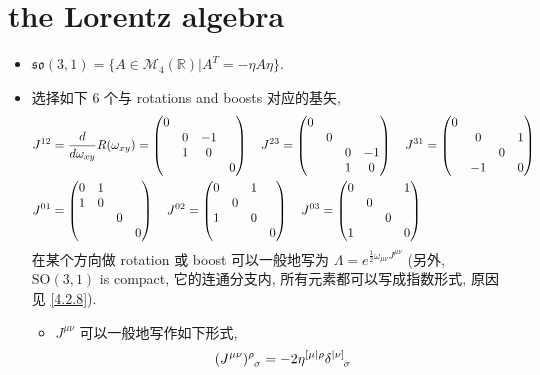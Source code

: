 \section{the Lorentz algebra}
\begin{itemize}
	\item $\mathfrak{so}(3, 1) = \{A \in \mathcal{M}_4(\mathbb{R}) | A^T = - \eta A \eta\}$.
	
	\item 选择如下 6 个与 rotations and boosts 对应的基矢,
	\begin{align}
		& J^{1 2} = \frac{d}{d\omega_{x y}} R(\omega_{x y}) = \begin{pmatrix}
			0 & & & \\
			& 0 & - 1 & \\
			& 1 & 0 & \\
			& & & 0
		\end{pmatrix} \quad J^{2 3} = \begin{pmatrix}
			0 & & & \\
			& 0 & & \\
			& & 0 & - 1 \\
			& & 1 & 0
		\end{pmatrix} \quad J^{3 1} = \begin{pmatrix}
			0 & & & \\
			& 0 & & 1 \\
			& & 0 & \\
			& - 1 & & 0
		\end{pmatrix} \notag \\
		& J^{0 1} = \begin{pmatrix}
			0 & 1 & & \\
			1 & 0 & & \\
			& & 0 & \\
			& & & 0
		\end{pmatrix} \quad J^{0 2} = \begin{pmatrix}
			0 & & 1 & \\
			& 0 & & \\
			1 & & 0 & \\
			& & & 0
		\end{pmatrix} \quad J^{0 3} = \begin{pmatrix}
			0 & & & 1 \\
			& 0 & & \\
			& & 0 & \\
			1 & & & 0
		\end{pmatrix}
	\end{align}
	在某个方向做 rotation 或 boost 可以一般地写为 $\Lambda = e^{\frac{1}{2} \omega_{\mu \nu} J^{\mu \nu}}$ (另外, $\mathrm{SO}(3, 1)$ is compact, 它的连通分支内, 所有元素都可以写成指数形式, 原因见 \eqref{4.2.8}).
	\begin{itemize}
		\item $J^{\mu \nu}$ 可以一般地写作如下形式,
		\begin{equation}
			\tensor{(J^{\mu \nu})}{^\rho_\sigma} = - 2 \eta^{[\mu| \rho} \tensor{\delta}{^{|\nu]}_\sigma}
		\end{equation}
		

\end{itemize}
\end{itemize}
